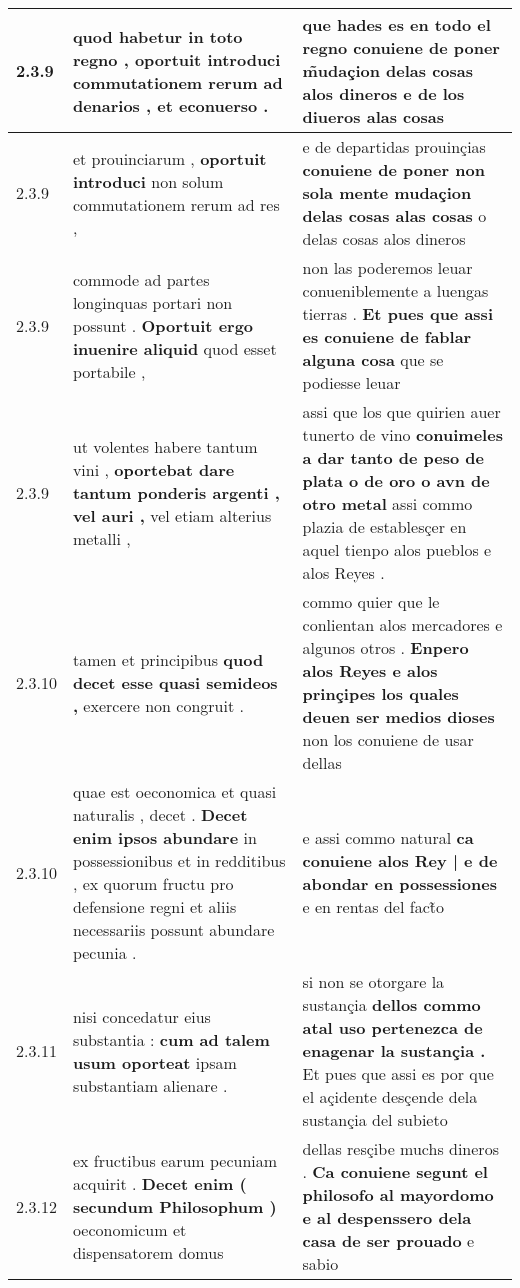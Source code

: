 \begin{tabular}{|p{1cm}|p{6.5cm}|p{6.5cm}|}
2.3.9 & quod habetur in toto regno , \textbf{ oportuit introduci commutationem rerum ad denarios , } et econuerso . & que hades es en todo el regno \textbf{ conuiene de poner m̃udaçion delas cosas alos dineros } e de los diueros alas cosas \\\hline
2.3.9 & et prouinciarum , \textbf{ oportuit introduci } non solum commutationem rerum ad res , & e de departidas prouinçias \textbf{ conuiene de poner non sola mente mudaçion delas cosas alas cosas } o delas cosas alos dineros \\\hline
2.3.9 & commode ad partes longinquas portari non possunt . \textbf{ Oportuit ergo inuenire aliquid } quod esset portabile , & non las poderemos leuar conueniblemente a luengas tierras . \textbf{ Et pues que assi es conuiene de fablar alguna cosa } que se podiesse leuar \\\hline
2.3.9 & ut volentes habere tantum vini , \textbf{ oportebat dare tantum ponderis argenti , vel auri , } vel etiam alterius metalli , & assi que los que quirien auer tunerto de vino \textbf{ conuimeles a dar tanto de peso de plata o de oro o avn de otro metal } assi commo plazia de establesçer en aquel tienpo alos pueblos e alos Reyes . \\\hline
2.3.10 & tamen et principibus \textbf{ quod decet esse quasi semideos , } exercere non congruit . & commo quier que le conlientan alos mercadores e algunos otros . \textbf{ Enpero alos Reyes e alos prinçipes los quales deuen ser medios dioses } non los conuiene de usar dellas \\\hline
2.3.10 & quae est oeconomica et quasi naturalis , decet . \textbf{ Decet enim ipsos abundare } in possessionibus et in redditibus , ex quorum fructu pro defensione regni et aliis necessariis possunt abundare pecunia . & e assi commo natural \textbf{ ca conuiene alos Rey | e de abondar en possessiones } e en rentas del fact̃o \\\hline
2.3.11 & nisi concedatur eius substantia : \textbf{ cum ad talem usum oporteat } ipsam substantiam alienare . & si non se otorgare la sustançia \textbf{ dellos commo atal uso pertenezca de enagenar la sustançia . } Et pues que assi es por que el açidente desçende dela sustançia del subieto \\\hline
2.3.12 & ex fructibus earum pecuniam acquirit . \textbf{ Decet enim ( secundum Philosophum ) } oeconomicum et dispensatorem domus & dellas resçibe muchs dineros . \textbf{ Ca conuiene segunt el philosofo al mayordomo e al despenssero dela casa de ser prouado } e sabio \\\hline

\end{tabular}
